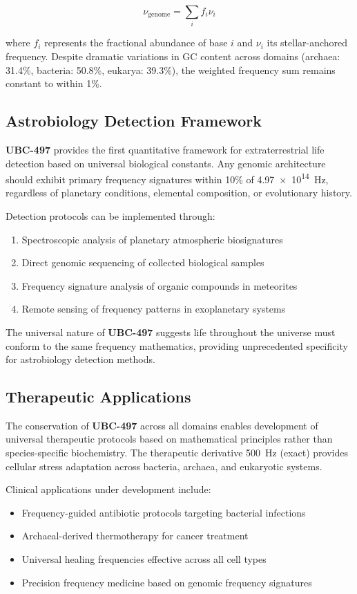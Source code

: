 \documentclass[9pt,twocolumn,twoside,lineno]{pnas-new}
\newcommand{\UBC}[1]{\textbf{UBC-#1}}
\newcommand{\freq}[1]{\SI{#1}{\hertz}}
\begin{document}
\begin{equation}
\nu_{\text{genome}} = \sum_{i} f_i \nu_i
\end{equation}

where $f_i$ represents the fractional abundance of base $i$ and $\nu_i$ its stellar-anchored frequency. Despite dramatic variations in GC content across domains (archaea: 31.4\%, bacteria: 50.8\%, eukarya: 39.3\%), the weighted frequency sum remains constant to within 1\%.

\subsection*{Astrobiology Detection Framework}

\UBC{497} provides the first quantitative framework for extraterrestrial life detection based on universal biological constants. Any genomic architecture should exhibit primary frequency signatures within 10\% of \freq{4.97e14}, regardless of planetary conditions, elemental composition, or evolutionary history.

Detection protocols can be implemented through:
\begin{enumerate}
\item Spectroscopic analysis of planetary atmospheric biosignatures
\item Direct genomic sequencing of collected biological samples
\item Frequency signature analysis of organic compounds in meteorites
\item Remote sensing of frequency patterns in exoplanetary systems
\end{enumerate}

The universal nature of \UBC{497} suggests life throughout the universe must conform to the same frequency mathematics, providing unprecedented specificity for astrobiology detection methods.

\subsection*{Therapeutic Applications}

The conservation of \UBC{497} across all domains enables development of universal therapeutic protocols based on mathematical principles rather than species-specific biochemistry. The therapeutic derivative \freq{500} (exact) provides cellular stress adaptation across bacteria, archaea, and eukaryotic systems.

Clinical applications under development include:
\begin{itemize}
\item Frequency-guided antibiotic protocols targeting bacterial infections
\item Archaeal-derived thermotherapy for cancer treatment
\item Universal healing frequencies effective across all cell types
\item Precision frequency medicine based on genomic frequency signatures
\end{itemize}
\end{document}
